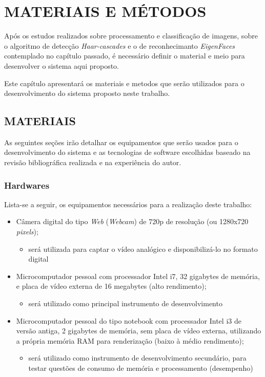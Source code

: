 
\chapter{MATERIAIS E MÉTODOS}\label{ch:materiais-metodos}
Após os estudos realizados sobre processamento e classificação de imagens, sobre o algoritmo de detecção \textit{Haar-cascades} e o de reconhecimanto \textit{EigenFaces} contemplado no capítulo passado, é necessário definir o material e meio para desenvolver o sistema aqui proposto.

Este capítulo apresentará os materiais e metodos que serão utilizados para o desenvolvimento do sistema proposto neste trabalho.


\section{MATERIAIS}\label{sec: tec-ferramenta}
As seguintes seções irão detalhar os equipamentos que serão usados para o desenvolvimento do sistema e as tecnologias de software escolhidas baseado na revisão bibliográfica realizada e na experiência do autor.

\subsection{Hardwares}\label{sub-hardw}
Lista-se a seguir, os equipamentos necessários para a realização deste trabalho:

\begin{itemize}
	
	\item Câmera digital do tipo \textit{Web} (\textit{Webcam}) de 720p de resolução (ou 1280x720 \textit{pixels});
	\begin{itemize}
		\item será utilizada para captar o vídeo analógico e disponibilizá-lo no formato digital
	\end{itemize}

	\item Microcomputador pessoal com processador Intel i7, 32 gigabytes de memória, e placa de vídeo externa de 16 megabytes (alto rendimento);
	\begin{itemize}
		\item será utilizado como principal instrumento de desenvolvimento
	\end{itemize}
	
	\item Microcomputador pessoal do tipo notebook com processador Intel i3 de versão antiga, 2 gigabytes de memória, sem placa de vídeo externa, utilizando a própria memória RAM para renderização (baixo à médio rendimento);
	\begin{itemize}
		\item será utilizado como instrumento de desenvolvimento secundário, para testar questões de consumo de memória e processamento (desempenho)	
	\end{itemize}
	
\end{itemize}

